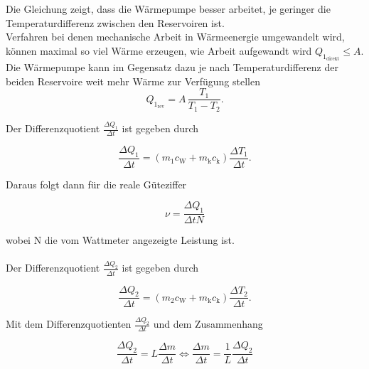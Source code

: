 Die Gleichung zeigt, dass die Wärmepumpe besser arbeitet, je geringer die Temperaturdifferenz zwischen den 
Reservoiren ist.\\
Verfahren bei denen mechanische Arbeit in Wärmeenergie umgewandelt wird, können maximal so viel Wärme erzeugen,
wie Arbeit aufgewandt wird $Q_{1_{\text{direkt}}} \leq A$. 
Die Wärmepumpe kann im Gegensatz dazu je nach Temperaturdifferenz der beiden Reservoire weit mehr Wärme
zur Verfügung stellen
\begin{equation*}
    Q_{1_{\text{rev}}} = A\, \frac{T_1}{T_1 - T_2} .
\end{equation*}

Der Differenzquotient $\frac{ΔQ_1}{Δt}$ ist gegeben durch 

\begin{equation}
    \label{delQ1}
    \frac{ΔQ_1}{Δt} = \left(m_1c_{\text{W}} + m_{\text{k}}c_{\text{k}}\right)\frac{ΔT_1}{Δt}.
\end{equation}

Daraus folgt dann für die reale Güteziffer

\begin{equation}
    \label{vreal}
    ν = \frac{ΔQ_1}{ΔtN}
\end{equation}

wobei N die vom Wattmeter angezeigte Leistung ist.\\
\\
Der Differenzquotient $\frac{ΔQ_2}{Δt}$ ist gegeben durch

\begin{equation}\label{eqn:diffQ2}
    \frac{ΔQ_2}{Δt} = \left(m_2c_{\text{W}} + m_{\text{k}}c_{\text{k}}\right)\frac{ΔT_2}{Δt}.
\end{equation}

Mit dem Differenzquotienten $\frac{ΔQ_2}{Δt}$ und dem Zusammenhang

\begin{equation}\label{eqn:massendurchsatz}
    \frac{ΔQ_2}{Δt} = L\frac{Δm}{Δt} \Leftrightarrow \frac{Δm}{Δt} = \frac{1}{L}\frac{ΔQ_2}{Δt}
\end{equation}

